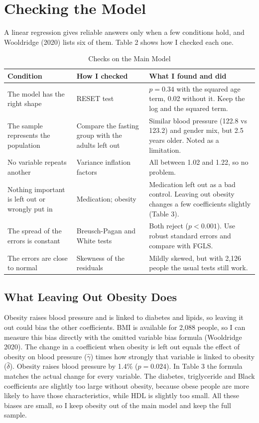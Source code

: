 \documentclass[preprint,letterpaper,11pt,authoryear]{elsarticle}
\begin{document}
\section{Checking the Model}
A linear regression gives reliable answers only when a few conditions hold, and Wooldridge (2020) lists six of them. Table 2 shows how I checked each one.

\begin{table}[!htbp]
\centering\small\setlength{\tabcolsep}{4pt}
\caption{Checks on the Main Model}
\begin{tabular}{>{\raggedright\arraybackslash}p{3.3cm}>{\raggedright\arraybackslash}p{4.0cm}>{\raggedright\arraybackslash}p{5.1cm}}
\toprule
Condition & How I checked & What I found and did \\
\midrule
The model has the right shape & RESET test & $p = 0.34$ with the squared age term, 0.02 without it. Keep the log and the squared term. \\
The sample represents the population & Compare the fasting group with the adults left out & Similar blood pressure (122.8 vs 123.2) and gender mix, but 2.5 years older. Noted as a limitation. \\
No variable repeats another & Variance inflation factors & All between 1.02 and 1.22, so no problem. \\
Nothing important is left out or wrongly put in & Medication; obesity & Medication left out as a bad control. Leaving out obesity changes a few coefficients slightly (Table 3). \\
The spread of the errors is constant & Breusch-Pagan and White tests & Both reject ($p < 0.001$). Use robust standard errors and compare with FGLS. \\
The errors are close to normal & Skewness of the residuals & Mildly skewed, but with 2,126 people the usual tests still work. \\
\bottomrule
\end{tabular}
\end{table}

\subsection{What Leaving Out Obesity Does}
Obesity raises blood pressure and is linked to diabetes and lipids, so leaving it out could bias the other coefficients. BMI is available for 2,088 people, so I can measure this bias directly with the omitted variable bias formula (Wooldridge 2020). The change in a coefficient when obesity is left out equals the effect of obesity on blood pressure ($\hat\gamma$) times how strongly that variable is linked to obesity ($\hat\delta$). Obesity raises blood pressure by 1.4\% ($p = 0.024$). In Table 3 the formula matches the actual change for every variable. The diabetes, triglyceride and Black coefficients are slightly too large without obesity, because obese people are more likely to have those characteristics, while HDL is slightly too small. All these biases are small, so I keep obesity out of the main model and keep the full sample.
\end{document}
